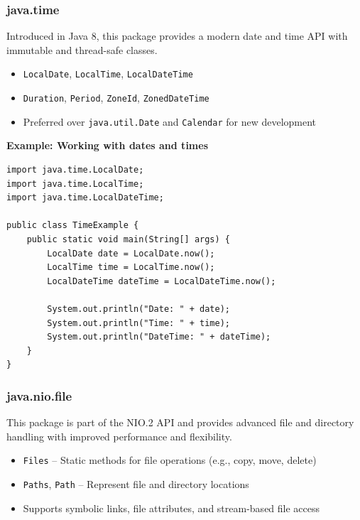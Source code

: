 \documentclass{article}
\newcommand{\codecmd}[1]{\textcolor[rgb]{0,0.5,0}{\texttt{#1}}}
\begin{document}
\subsubsection*{java.time}

Introduced in Java 8, this package provides a modern date and time API with immutable and thread-safe classes.

\begin{itemize}
    \item \codecmd{LocalDate}, \codecmd{LocalTime}, \codecmd{LocalDateTime}
    \item \codecmd{Duration}, \codecmd{Period}, \codecmd{ZoneId}, \codecmd{ZonedDateTime}
    \item Preferred over \codecmd{java.util.Date} and \codecmd{Calendar} for new development
\end{itemize}

\noindent\textbf{Example: Working with dates and times}
\begin{verbatim}
import java.time.LocalDate;
import java.time.LocalTime;
import java.time.LocalDateTime;

public class TimeExample {
    public static void main(String[] args) {
        LocalDate date = LocalDate.now();
        LocalTime time = LocalTime.now();
        LocalDateTime dateTime = LocalDateTime.now();

        System.out.println("Date: " + date);
        System.out.println("Time: " + time);
        System.out.println("DateTime: " + dateTime);
    }
}
\end{verbatim}

\subsubsection*{java.nio.file}

This package is part of the NIO.2 API and provides advanced file and directory handling with improved performance and flexibility.

\begin{itemize}
    \item \codecmd{Files} – Static methods for file operations (e.g., copy, move, delete)
    \item \codecmd{Paths}, \codecmd{Path} – Represent file and directory locations
    \item Supports symbolic links, file attributes, and stream-based file access
\end{itemize}
\end{document}
